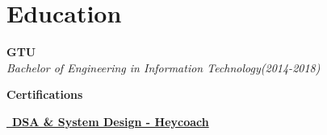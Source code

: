 \documentclass[letterpaper,10pt]{article}
\newcommand{\heading}[2]{
  \hspace{10pt}#1\hfill#2\\
}
\newcommand{\headingBf}[2]{
  \heading{\textbf{#1}}{\textbf{#2}}
}
\newcommand{\headingIt}[2]{
  \heading{\textit{#1}}{\textit{#2}}
}
\newenvironment{resume_list}{
  \vspace{-7pt}
  \begin{itemize}[itemsep=-2px, parsep=1pt, leftmargin=30pt]
}{
  \end{itemize}
}
\begin{document}

  \section{Education}

  \headingBf{GTU}{} %
  \headingIt{Bachelor of Engineering in Information Technology(2014-2018)}{}

  \vspace{5pt}
  \headingBf{Certifications}{}
  \begin{resume_list}
    \item \href{https://drive.google.com/file/d/1rONFXjSGLBtmLBLUU2Wlq_v4KNv8CEHR/view}{
      \raisebox{-0.15\height} \faCertificate\ \textbf{DSA \& System Design \hspace{2pt}- Heycoach}}
  \end{resume_list}




\end{document}
